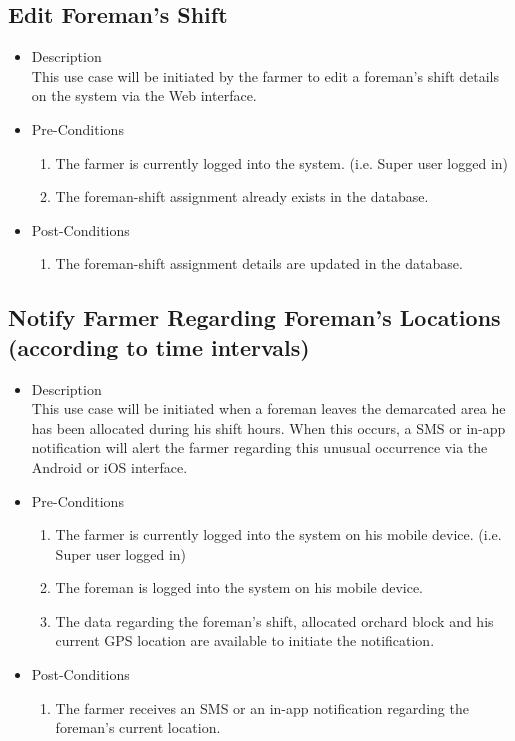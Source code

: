\documentclass[11pt,fleqn]{book} %
\begin{document}
	\subsection{Edit Foreman’s Shift}
	\begin{itemize}
		\item Description\\
		This use case will be initiated by the farmer to edit a foreman’s shift details on the system via the Web interface.
		\item Pre-Conditions
		\begin{enumerate}
			\item The farmer is currently logged into the system. (i.e. Super user logged in)
			\item The foreman-shift assignment already exists in the database.	
		\end{enumerate}
		\item Post-Conditions
		\begin{enumerate}
			\item The foreman-shift assignment details are updated in the database.
		\end{enumerate}
	\end{itemize}
	
	\subsection{Notify Farmer Regarding Foreman’s Locations (according to time intervals)}
	\begin{itemize}
		\item Description\\
		This use case will be initiated when a foreman leaves the demarcated area he has been allocated during his shift hours. When this occurs, a SMS or in-app notification will alert the farmer regarding this unusual occurrence via the Android or iOS interface.
		\item Pre-Conditions
		\begin{enumerate}
			\item The farmer is currently logged into the system on his mobile device. (i.e. Super user logged in)
			\item The foreman is logged into the system on his mobile device.
			\item The data regarding the foreman’s shift, allocated orchard block and his current GPS location are available to initiate the notification.						
		\end{enumerate}
		\item Post-Conditions
		\begin{enumerate}
			\item The farmer receives an SMS or an in-app notification regarding the foreman’s current location.
		\end{enumerate}
	\end{itemize}
	
\end{document}
